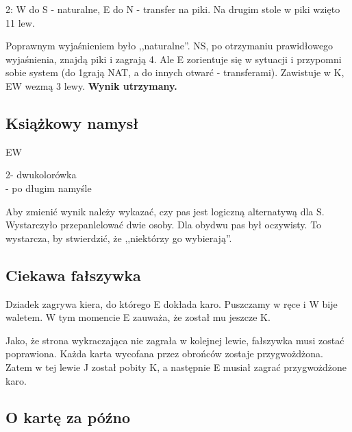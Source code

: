 \documentclass[12pt, a4paper]{article}
\newcounter{board}
\newcommand\nextboard{\stepcounter{board}\theboard}
\begin{document}
2\hearts: W do S - naturalne, E do N - transfer na piki.
Na drugim stole w piki wzięto 11 lew. 

Poprawnym wyjaśnieniem było ,,naturalne''. NS, po otrzymaniu prawidłowego
wyjaśnienia, znajdą piki i zagrają 4\spades. Ale E zorientuje się w sytuacji 
i przypomni sobie system (do 1\diams grają NAT, a do innych otwarć - transferami).
Zawistuje w \xhearts K, EW wezmą 3 lewy.
\textbf{Wynik utrzymany.}




\pagebreak
\subsection*{Książkowy namysł}

\handdiagramv[\nextboard]{\vhand{K754}{KQ96}{T62}{J9}}
				{}
                {}
                {}{EW}


2\hearts - dwukolorówka \\
\pass - po długim namyśle 

Aby zmienić wynik należy wykazać, czy pas jest logiczną alternatywą
dla S. Wystarczyło przepanlelować dwie osoby. Dla obydwu pas 
był oczywisty. To wystarcza, by stwierdzić, że ,,niektórzy go
wybierają''.


\subsection*{Ciekawa fałszywka}

Dziadek zagrywa kiera, do którego E dokłada karo. Puszczamy w ręce
i W bije waletem. W tym momencie E zauważa, że został mu jeszcze \xhearts K.

Jako, że strona wykraczająca nie zagrała w kolejnej lewie, 
fałszywka musi zostać poprawiona. Każda karta wycofana przez obrońców
zostaje przygwożdżona. Zatem w tej lewie \xhearts J został pobity \xhearts K,
a następnie E musiał zagrać przygwożdżone karo.

\subsection*{O kartę za późno}
\end{document}

